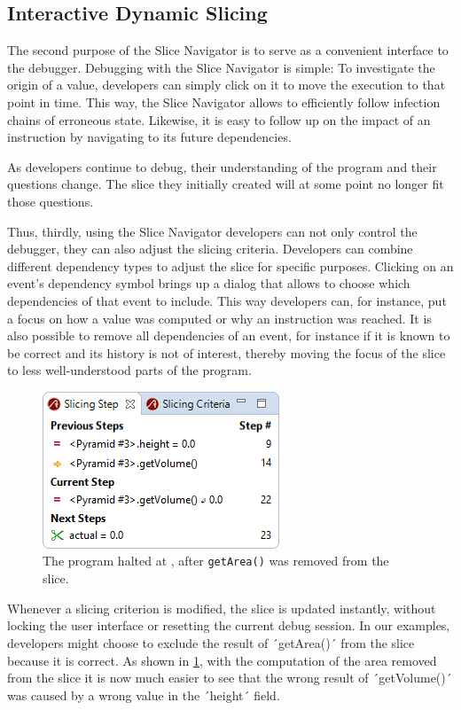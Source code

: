 \documentclass[
			english,
			review,
			]{elsarticle}
\begin{document}
\subsection{Interactive Dynamic Slicing}

The second purpose of the Slice Navigator is to serve as a convenient interface to the debugger.
Debugging with the Slice Navigator is simple:
To investigate the origin of a value, developers can simply click on it to move the execution to that point in time.
This way, the Slice Navigator allows to efficiently follow infection chains of erroneous state.
Likewise, it is easy to follow up on the impact of an instruction by navigating to its future dependencies.

As developers continue to debug, their understanding of the program and their questions change.
The slice they initially created will at some point no longer fit those questions.

Thus, thirdly, using the Slice Navigator developers can not only control the debugger, they can also adjust the slicing criteria.
Developers can combine different dependency types to adjust the slice for specific purposes.
Clicking on an event's dependency symbol brings up a dialog that allows to choose which dependencies of that event to include.
This way developers can, for instance, put a focus on how a value was computed or why an instruction was reached.
It is also possible to remove all dependencies of an event, for instance if it is known to be correct and its history is not of interest, thereby moving the focus of the slice to less well-understood parts of the program.

\begin{figure}
	\centering
		\includegraphics[width=0.40\linewidth]{slice2.png}
	\caption{The program halted at , after \lstinline{getArea()} was removed from the slice.}
	\label{fig:slice2}
\end{figure}

Whenever a slicing criterion is modified, the slice is updated instantly, without locking the user interface or resetting the current debug session.
In our examples, developers might choose to exclude the result of ´getArea()´ from the slice because it is correct.
As shown in \cref{fig:slice2}, with the computation of the area removed from the slice it is now much easier to see that the wrong result of ´getVolume()´ was caused by a wrong value in the ´height´ field.
\end{document}
